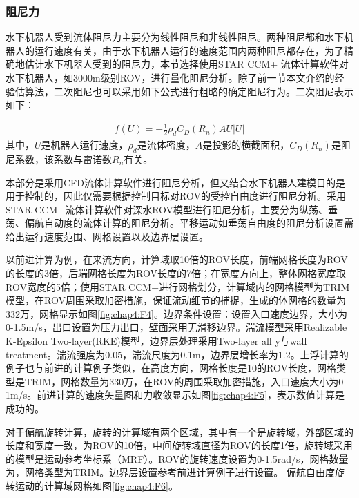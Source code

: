 \subsubsection{阻尼力}

水下机器人受到流体阻尼力主要分为线性阻尼和非线性阻尼。两种阻尼都和水下机器人的运行速度有关，由于水下机器人运行的速度范围内两种阻尼都存在，为了精确地估计水下机器人受到的阻尼力，本节选择使用STAR CCM+ 流体计算软件对水下机器人，如3000m级别ROV，进行量化阻尼分析。除了前一节本文介绍的经验估算法，二次阻尼也可以采用如下公式进行粗略的确定阻尼行为。二次阻尼表示如下：

\begin{equation}
\begin{aligned}
f(U)=-\frac{1}{2}\rho_d C_D(R_n)AU|U|
\end{aligned}
\end{equation}
其中，$U$是机器人运行速度，$\rho_{d}$是流体密度，$A$是投影的横截面积，$C_D(R_n)$是阻尼系数，该系数与雷诺数$R_{n}$有关。

本部分是采用CFD流体计算软件进行阻尼分析，但又结合水下机器人建模目的是用于控制的，因此仅需要根据控制目标对ROV的受控自由度进行阻尼分析。采用STAR CCM+流体计算软件对深水ROV模型进行阻尼分析，主要分为纵荡、垂荡、偏航自动度的流体计算的阻尼分析。平移运动如垂荡自由度的阻尼分析设置需给出运行速度范围、网格设置以及边界层设置。

以前进计算为例，在来流方向，计算域取10倍的ROV长度，前端网格长度为ROV的长度的3倍，后端网格长度为ROV长度的7倍；在宽度方向上，整体网格宽度取ROV宽度的5倍；使用STAR CCM+进行网格划分，计算域内的网格模型为TRIM模型，在ROV周围采取加密措施，保证流动细节的捕捉，生成的体网格的数量为332万，网格显示如图\ref{fig:chap4:F4}。边界条件设置：设置入口速度边界，大小为0-1.5m/s，出口设置为压力出口，壁面采用无滑移边界。湍流模型采用Realizable K-Epsilon Two-layer(RKE)模型，边界层处理采用Two-layer all y与wall treatment。湍流强度为0.05，湍流尺度为0.1m，边界层增长率为1.2。上浮计算的例子也与前进的计算例子类似，在高度方向，网格长度是10的ROV长度，网格类型是TRIM，网格数量为330万，在ROV的周围采取加密措施，入口速度大小为0-1m/s。前进计算的速度矢量图和力收敛显示如图\ref{fig:chap4:F5}，表示数值计算是成功的。

对于偏航旋转计算，旋转的计算域有两个区域，其中有一个是旋转域，外部区域的长度和宽度一致，为ROV的10倍，中间旋转域直径为ROV的长度1倍，旋转域采用的模型是运动参考坐标系（MRF）。ROV的旋转速度设置为0-1.5rad/s，网格数量为，网格类型为TRIM。边界层设置参考前进计算例子进行设置。
偏航自由度旋转运动的计算域网格如图\ref{fig:chap4:F6}。

